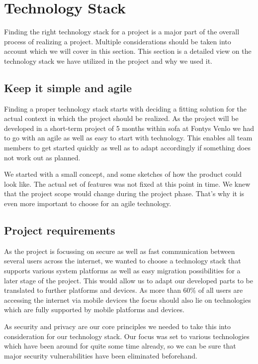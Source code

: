 \chapter{Technology Stack}\label{ch:technology-stack}
Finding the right technology stack for a project is a major part of the overall process of realizing a project.
Multiple considerations should be taken into account which we will cover in this section.
This section is a detailed view on the technology stack we have utilized in the project and why we used it.

\section{Keep it simple and agile}\label{sec:keep-it-simple-and-agile}

Finding a proper technology stack starts with deciding a fitting solution for the actual context in which the project
should be realized.
As the project will be developed in a short-term project of 5 months within \ac{sofa} at Fontys Venlo we
had to go with an agile as well as easy to start with technology.
This enables all team members to get started quickly as well as to adapt accordingly if something does not work out as
planned.

We started with a small concept, and some sketches of how the product could look like.
The actual set of features was not fixed at this point in time.
We knew that the project scope would change during the project phase.
That's why it is even more important to choose for an agile technology.

\section{Project requirements}\label{sec:project-requirements}

As the project is focussing on secure as well as fast communication between several users across the internet, we wanted
to choose a technology stack that supports various system platforms as well as easy migration possibilities for a later
stage of the project.
This would allow us to adapt our developed parts to be translated to further platforms and devices.
As more than 60\% of all users are accessing the internet via mobile devices the focus should also lie on technologies
which are fully supported by mobile platforms and devices.

As security and privacy are our core principles we needed to take this into consideration for our technology stack.
Our focus was set to various technologies which have been around for quite some time already, so we can be sure that
major security vulnerabilities have been eliminated beforehand.

